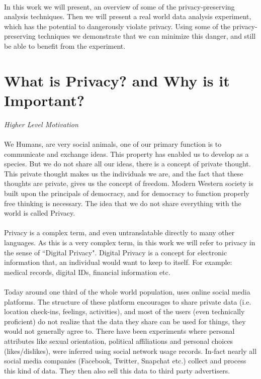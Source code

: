 \documentclass[12pt]{report}
\theoremstyle{named}
\begin{document}
\paragraph{}
In this work we will present, an overview of some of the privacy-preserving analysis techniques. Then we will present a real world data analysis experiment, which has the potential to dangerously violate privacy. Using some of the privacy-preserving techniques we demonstrate that we can minimize this danger, and still be able to benefit from the experiment.


\section{What is Privacy? and Why is it Important?}
\textit{Higher Level Motivation}
\paragraph{}
We Humans, are very social animals, one of our primary function is to communicate and exchange ideas. This property has enabled us to develop as a species. But we do not share all our ideas, there is a concept of private thought. This private thought makes us the individuals we are, and the fact that these thoughts are private, gives us the concept of freedom. Modern Western society is built upon the principals of democracy, and for democracy to function properly free thinking is necessary. The idea that we do not share everything with the world is called Privacy. 
\paragraph{}
Privacy is a complex term, and even untranslatable directly to many other languages. As this is a very complex term, in this work we will refer to privacy in the sense of ``Digital Privacy". Digital Privacy is a concept for electronic information that, an individual would want to keep to itself.  For example: medical records, digital IDs, financial information etc. 
\paragraph{}
Today around one third of the whole world population\cite{SocialMediaPercent}, uses online social media platforms. The structure of these platform encourages to share private data (i.e. location check-ins, feelings, activities), and most of the users (even technically proficient) do not realize that the data they share can be used for things, they would not generally agree to. There have been experiments where personal attributes like sexual orientation, political affiliations and personal choices (likes/dislikes), were inferred using social network usage records. In-fact nearly all social media companies (Facebook, Twitter, Snapchat etc.) collect and process this kind of data. They then also sell this data to third party advertisers. 
\end{document}

